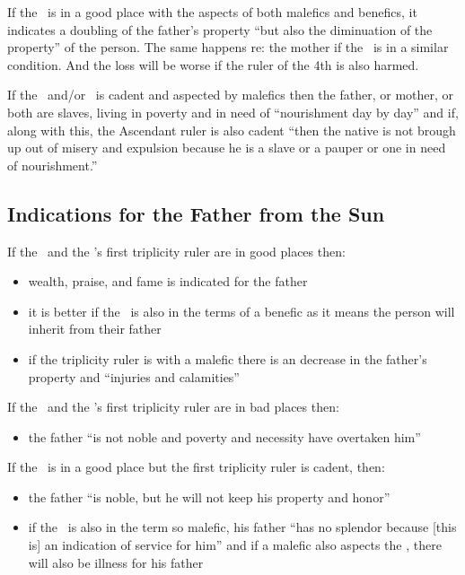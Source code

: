 If the \Sun\, is in a good place with the aspects of both malefics and benefics, it indicates a doubling of the father's property ``but also the diminuation of the property'' of the person. The same happens re: the mother if the \Moon\, is in a similar condition. And the loss will be worse if the ruler of the 4th is also harmed.

If the \Sun\, and/or \Moon\, is cadent and aspected by malefics then the father, or mother, or both are slaves, living in poverty and in need of ``nourishment day by day'' and if, along with this, the Ascendant ruler is also cadent ``then the native is not brough up out of misery and expulsion because he is a slave or a pauper or one in need of nourishment.''

\subsection{Indications for the Father from the Sun}

If the \Sun\, and the \Sun's first triplicity ruler are in good places then:
\begin{itemize}[topsep=0em, itemsep=0em]
\item wealth, praise, and fame is indicated for the father
\item it is better if the \Sun\, is also in the terms of a benefic as it means the person will inherit from their father
\item if the triplicity ruler is with a malefic there is an decrease in the father's property and ``injuries and calamities''
\end{itemize}

\noindent If the \Sun\, and the \Sun's first triplicity ruler are in bad places then:
\begin{itemize}[topsep=0em, itemsep=0em]
\item the father ``is not noble and poverty and necessity have overtaken him''
\end{itemize}

\noindent If the \Sun\, is in a good place but the first triplicity ruler is cadent, then:
\begin{itemize}[topsep=0em, itemsep=0em]
\item the father ``is noble, but he will not keep his property and honor''

\item if the \Sun\, is also in the term so malefic, his father ``has no splendor because [this is] an indication of service for him'' and if a malefic  also aspects the \Sun,  there will also be illness for his father
\end{itemize}

